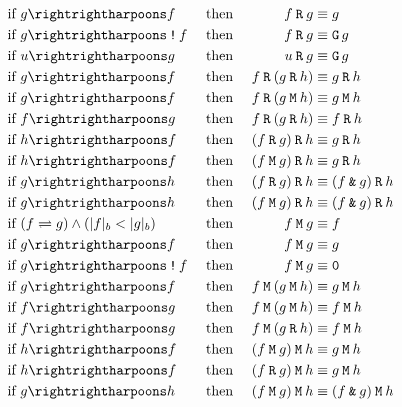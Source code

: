 \documentclass[a4paper,twoside,10pt,DIV=12]{scrreprt}
\DeclareMathOperator{\G}{\texttt{G}}
\newcommand{\R}{\mathbin{\texttt{R}}}
\newcommand{\M}{\mathbin{\texttt{M}}}
\DeclareMathOperator{\NOT}{\texttt{!}}
\newcommand{\AND}{\mathbin{\texttt{\&}}}
\newcommand{\0}{\texttt{0}}
\newcommand{\1}{\texttt{1}}
\def\simp{\rightrightharpoons}
\begin{document}
\begin{alignat*}{3}
\text{if~} & g\simp f        &  & \text{~then~} & f\R g               & \equiv g                  \\
\text{if~} & g\simp \NOT f   &  & \text{~then~} & f\R g               & \equiv \G g               \\
\text{if~} & u\simp g        &  & \text{~then~} & u\R g               & \equiv \G g               \\
\text{if~} & g\simp f        &  & \text{~then~} & f\R (g \R h)        & \equiv g \R h             \\
\text{if~} & g\simp f        &  & \text{~then~} & f\R (g \M h)        & \equiv g \M h             \\
\text{if~} & f\simp g        &  & \text{~then~} & f\R (g \R h)        & \equiv f \R h             \\
\text{if~} & h\simp f        &  & \text{~then~} & (f\R g) \R h        & \equiv g \R h             \\
\text{if~} & h\simp f        &  & \text{~then~} & (f\M g) \R h        & \equiv g \R h             \\
\text{if~} & g\simp h        &  & \text{~then~} & (f\R g) \R h        & \equiv (f \AND g) \R h    \\
\text{if~} & g\simp h        &  & \text{~then~} & (f\M g) \R h        & \equiv (f \AND g) \R h    \\
\text{if~} & \flessg         &  & \text{~then~} & f\M g               & \equiv f                  \\
\text{if~} & g\simp f        &  & \text{~then~} & f\M g               & \equiv g                  \\
\text{if~} & g\simp \NOT f   &  & \text{~then~} & f\M g               & \equiv \0                 \\
\text{if~} & g\simp f        &  & \text{~then~} & f\M (g \M h)        & \equiv g \M h             \\
\text{if~} & f\simp g        &  & \text{~then~} & f\M (g \M h)        & \equiv f \M h             \\
\text{if~} & f\simp g        &  & \text{~then~} & f\M (g \R h)        & \equiv f \M h             \\
\text{if~} & h\simp f        &  & \text{~then~} & (f\M g) \M h        & \equiv g \M h             \\
\text{if~} & h\simp f        &  & \text{~then~} & (f\R g) \M h        & \equiv g \M h             \\
\text{if~} & g\simp h        &  & \text{~then~} & (f\M g) \M h        & \equiv (f \AND g) \M h    \\
\end{alignat*}
\endgroup
\end{document}
